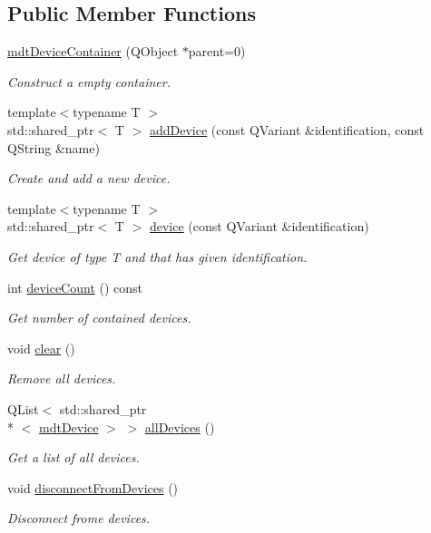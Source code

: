 \subsection*{Public Member Functions}
\begin{DoxyCompactItemize}
\item 
\hyperlink{classmdt_device_container_a8e68b1aac362bc6edff3209d00c2ad4d}{mdt\-Device\-Container} (Q\-Object $\ast$parent=0)
\begin{DoxyCompactList}\small\item\em Construct a empty container. \end{DoxyCompactList}\item 
{\footnotesize template$<$typename T $>$ }\\std\-::shared\-\_\-ptr$<$ T $>$ \hyperlink{classmdt_device_container_a843e03b57889faac6e062860e95caad1}{add\-Device} (const Q\-Variant \&identification, const Q\-String \&name)
\begin{DoxyCompactList}\small\item\em Create and add a new device. \end{DoxyCompactList}\item 
{\footnotesize template$<$typename T $>$ }\\std\-::shared\-\_\-ptr$<$ T $>$ \hyperlink{classmdt_device_container_a6361dffbdc3d47f0cce86f78b5f202eb}{device} (const Q\-Variant \&identification)
\begin{DoxyCompactList}\small\item\em Get device of type T and that has given identification. \end{DoxyCompactList}\item 
int \hyperlink{classmdt_device_container_a95168e7221db07ea8df6a2c028ebf560}{device\-Count} () const 
\begin{DoxyCompactList}\small\item\em Get number of contained devices. \end{DoxyCompactList}\item 
void \hyperlink{classmdt_device_container_a18ade1b299dcf87e0097c24cb346f36f}{clear} ()
\begin{DoxyCompactList}\small\item\em Remove all devices. \end{DoxyCompactList}\item 
Q\-List$<$ std\-::shared\-\_\-ptr\\*
$<$ \hyperlink{classmdt_device}{mdt\-Device} $>$ $>$ \hyperlink{classmdt_device_container_a9a04f05d7cce394fd30f8669edb6a181}{all\-Devices} ()
\begin{DoxyCompactList}\small\item\em Get a list of all devices. \end{DoxyCompactList}\item 
void \hyperlink{classmdt_device_container_a45465d82f6ed697366d5d45de2334855}{disconnect\-From\-Devices} ()
\begin{DoxyCompactList}\small\item\em Disconnect frome devices. \end{DoxyCompactList}\end{DoxyCompactItemize}


